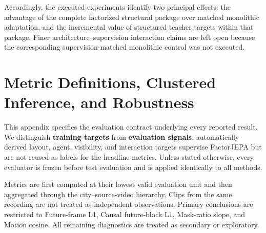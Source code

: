 Accordingly, the executed experiments identify two principal effects:
the advantage of the complete factorized structural package over
matched monolithic adaptation, and the incremental value of structured
teacher targets within that package. Finer architecture--supervision
interaction claims are left open because the corresponding
supervision-matched monolithic control was not executed.




















































\section{Metric Definitions, Clustered Inference, and Robustness}
\label{app:metrics_statistics}

This appendix specifies the evaluation contract underlying every
reported result. We distinguish \textbf{training targets} from
\textbf{evaluation signals}: automatically derived layout, agent, visibility,
and interaction targets supervise FactorJEPA but are not reused as
labels for the headline metrics. Unless stated otherwise, every
evaluator is frozen before test evaluation and is applied identically
to all methods.

Metrics are first computed at their lowest valid evaluation unit and
then aggregated through the city--source-video hierarchy. Clips from
the same recording are not treated as independent observations.
Primary conclusions are restricted to Future-frame L1, Causal
future-block L1, Mask-ratio slope, and Motion cosine. All remaining diagnostics are
treated as secondary or exploratory.



